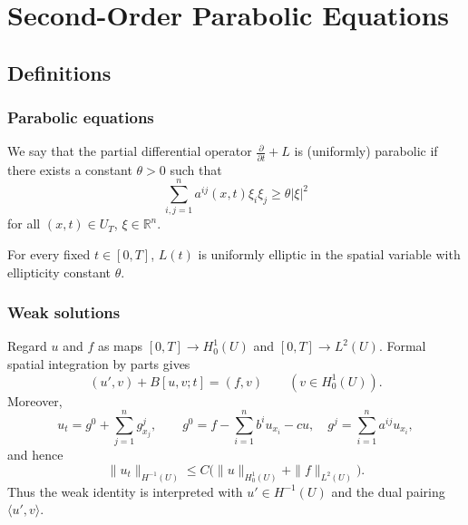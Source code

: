 
\section{Second-Order Parabolic Equations}
\label{sec:second-order-parabolic-equations}

\subsection{Definitions}

\subsubsection{Parabolic equations}

\begin{definition}
\label{def:uniform-parabolicity}
We say that the partial differential operator $\frac{\partial}{\partial t} + L$ is (uniformly) parabolic if there exists a constant $\theta > 0$ such that
\[
\sum_{i,j=1}^{n} a^{ij}(x,t)\xi_i \xi_j \geq \theta|\xi|^2
\tag{4}
\]
for all $(x,t) \in U_T$, $\xi \in \mathbb{R}^n$.
\end{definition}

\begin{remark}
\label{rem:parabolic-operator-elliptic-fixed-time}
For every fixed $t\in[0,T]$, $L(t)$ is uniformly elliptic in the spatial variable with ellipticity constant $\theta$.
\end{remark}

\subsubsection{Weak solutions}

\begin{remark}
\label{rem:motivation-weak-solution-parabolic}
Regard $u$ and $f$ as maps $[0,T]\to H_0^1(U)$ and $[0,T]\to L^2(U)$. Formal spatial integration by parts gives
\[
(u',v)+B[u,v;t]=(f,v) \qquad (v\in H_0^1(U)).
\tag{9}
\]
Moreover,
\[
u_t=g^0+\sum_{j=1}^n g^j_{x_j},\qquad
g^0=f-\sum_{i=1}^n b^iu_{x_i}-cu,\quad
g^j=\sum_{i=1}^n a^{ij}u_{x_i},
\tag{10}
\]
and hence
\[
\|u_t\|_{H^{-1}(U)}\le C\bigl(\|u\|_{H_0^1(U)}+\|f\|_{L^2(U)}\bigr).
\]
Thus the weak identity is interpreted with $u'\in H^{-1}(U)$ and the dual pairing $\langle u',v\rangle$.
\end{remark}

